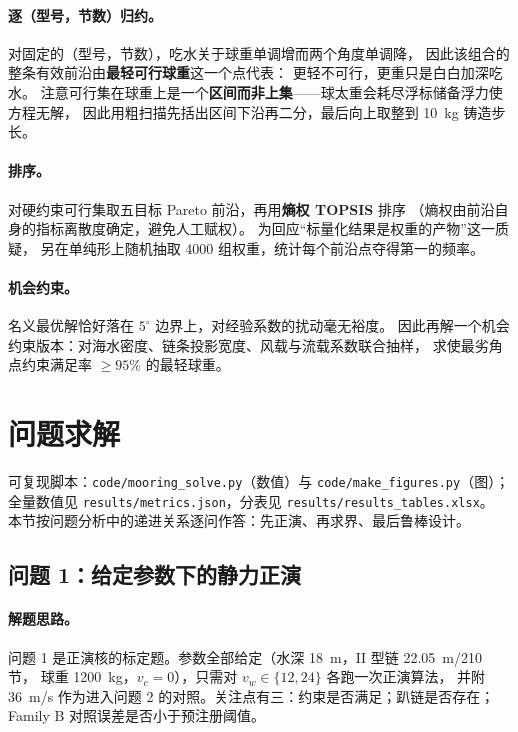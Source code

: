 \documentclass[UTF8,a4paper,zihao=-4]{ctexart}
\begin{document}
\paragraph{逐（型号，节数）归约。}
对固定的（型号，节数），吃水关于球重单调增而两个角度单调降，
因此该组合的整条有效前沿由\textbf{最轻可行球重}这一个点代表：
更轻不可行，更重只是白白加深吃水。
注意可行集在球重上是一个\textbf{区间而非上集}——球太重会耗尽浮标储备浮力使方程无解，
因此用粗扫描先括出区间下沿再二分，最后向上取整到 \SI{10}{kg} 铸造步长。

\paragraph{排序。}
对硬约束可行集取五目标 Pareto 前沿，再用\textbf{熵权 TOPSIS} 排序
（熵权由前沿自身的指标离散度确定，避免人工赋权）。
为回应“标量化结果是权重的产物”这一质疑，
另在单纯形上随机抽取 4000 组权重，统计每个前沿点夺得第一的频率。

\paragraph{机会约束。}
名义最优解恰好落在 \(5^\circ\) 边界上，对经验系数的扰动毫无裕度。
因此再解一个机会约束版本：对海水密度、链条投影宽度、风载与流载系数联合抽样，
求使最劣角点约束满足率 \(\ge95\%\) 的最轻球重。

\section{问题求解}

可复现脚本：\texttt{code/mooring\_solve.py}（数值）与 \texttt{code/make\_figures.py}（图）；
全量数值见 \texttt{results/metrics.json}，分表见 \texttt{results/results\_tables.xlsx}。
本节按问题分析中的递进关系逐问作答：先正演、再求界、最后鲁棒设计。

\subsection{问题 1：给定参数下的静力正演}\label{sec:q1}

\paragraph{解题思路。}
问题 1 是正演核的标定题。参数全部给定（水深 \SI{18}{m}，II 型链 \SI{22.05}{m}/210 节，
球重 \SI{1200}{kg}，\(v_c=0\)），只需对 \(v_w\in\{12,24\}\) 各跑一次正演算法，
并附 \SI{36}{m/s} 作为进入问题 2 的对照。关注点有三：约束是否满足；趴链是否存在；
Family B 对照误差是否小于预注册阈值。
\end{document}
